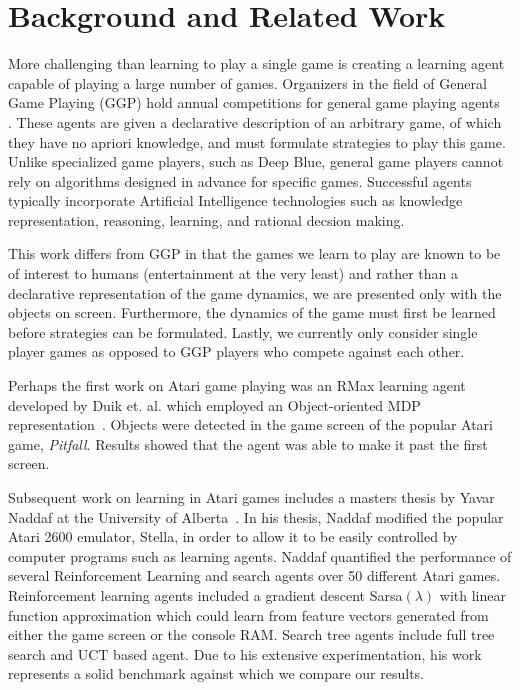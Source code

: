 \documentclass{acm_proc_article-sp}
\begin{document}
\section{Background and Related Work}
\label{sec:background}
More challenging than learning to play a single game is creating a learning agent capable of playing a large number of games. Organizers in the field of General Game Playing (GGP) hold annual competitions for general game playing agents~\cite{genesereth05} . These agents are given a declarative description of an arbitrary game, of which they have no apriori knowledge, and must formulate strategies to play this game. Unlike specialized game players, such as Deep Blue, general game players cannot rely on algorithms designed in advance for specific games. Successful agents typically incorporate Artificial Intelligence technologies such as knowledge representation, reasoning, learning, and rational decsion making. 

This work differs from GGP in that the games we learn to play are known to be of interest to humans (entertainment at the very least) and rather than a declarative representation of the game dynamics, we are presented only with the objects on screen. Furthermore, the dynamics of the game must first be learned before strategies can be formulated. Lastly, we currently only consider single player games as opposed to GGP players who compete against each other.

Perhaps the first work on Atari game playing was an RMax learning agent developed by Duik et. al. which employed an Object-oriented MDP representation~\cite{duik08}. Objects were detected in the game screen of the popular Atari game, \emph{Pitfall}. Results showed that the agent was able to make it past the first screen.

Subsequent work on learning in Atari games includes a masters thesis by Yavar Naddaf at the University of Alberta~\cite{naddaf10}. In his thesis, Naddaf modified the popular Atari 2600 emulator, Stella, in order to allow it to be easily controlled by computer programs such as learning agents. Naddaf quantified the performance of several Reinforcement Learning and search agents over 50 different Atari games. Reinforcement learning agents included a gradient descent Sarsa$(\lambda)$ with linear function approximation which could learn from feature vectors generated from either the game screen or the console RAM. Search tree agents include full tree search and UCT based agent. Due to his extensive experimentation, his work represents a solid benchmark against which we compare our results.
\end{document}

